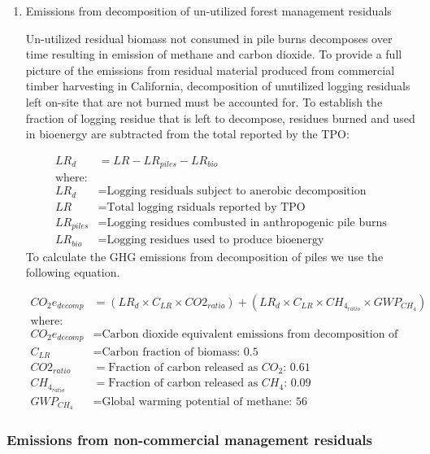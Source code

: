 \documentclass[a4paper]{article}
\begin{document}
\begin{enumerate}
\item Emissions from decomposition of un-utilized forest management residuals
\label{sec:orgheadline7}

Un-utilized residual biomass not consumed in pile burns decomposes over
time resulting in emission of methane and carbon dioxide. To provide a
full picture of the emissions from residual material produced from
commercial timber harvesting in California, decomposition of unutilized
logging residuals left on-site that are not burned must be accounted
for. To establish the fraction of logging residue that is left to
decompose, residues burned and used in bioenergy are subtracted from the
total reported by the TPO:

\begin{align*}
LR_d &= LR - LR_{piles} - LR_{bio} \\
\text{where:}\\
LR_d &= \text{Logging residuals subject to anerobic decomposition} \\
LR &= \text{Total logging rsiduals reported by TPO}\\
LR_{piles} &= \text{Logging residues combusted in anthropogenic pile burns}\\
LR_{bio} &= \text{Logging residues used to produce bioenergy}
\end{align*}
To calculate the GHG emissions from decomposition of piles we use the
following equation.

\begin{align*}
CO_2e_{decomp} &= \left(LR_d \times C_{LR} \times CO2_{ratio} \right) + \left(LR_d \times C_{LR} \times CH_4_{ratio}\times GWP_{CH_4}\right)\\
\text{where:}\\
CO_2e_{decomp} &= \text{Carbon dioxide equivalent emissions from decomposition of logging slash}\\
C_{LR} &= \text{Carbon fraction of biomass: 0.5}\\
CO2_{ratio} &= \text{Fraction of carbon released as } CO_2\text{: 0.61}\\
CH_4_{ratio} &= \text{Fraction of carbon released as } CH_4\text{: 0.09}\\
GWP_{CH_4} &= \text{Global warming potential of methane: 56}
\end{align*}
\end{enumerate}

\subsubsection{Emissions from non-commercial management residuals}
\label{sec:orgheadline10}
\end{document}
